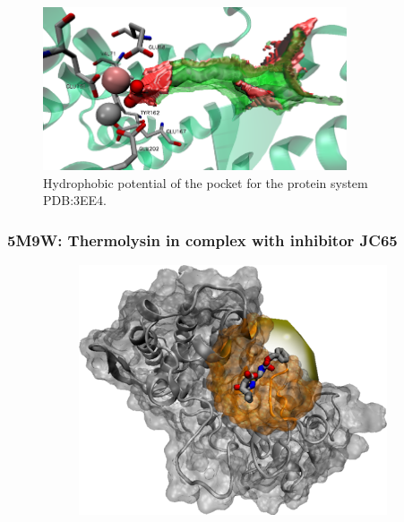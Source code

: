       \begin{figure}[H]
        \centering
        \includegraphics[width=0.8\textwidth]{figures/results/benchmark_prot/3ee4.png}
        \caption{\label{fig:benchmark/3ee4} Hydrophobic potential of the pocket for the protein system PDB:3EE4.}
      \end{figure}
    \pagebreak

    \subsubsection{5M9W: Thermolysin in complex with inhibitor JC65}
      \begin{figure}[H] \centering
        \begin{subfigure}[c]{0.3\textwidth} \centering
          \includegraphics[width=1\textwidth]{figures/results/ps_prot/5m9w.png}
        \end{subfigure}
        \begin{subfigure}[c]{0.3\textwidth} \centering
        \end{subfigure}
      \end{figure}

